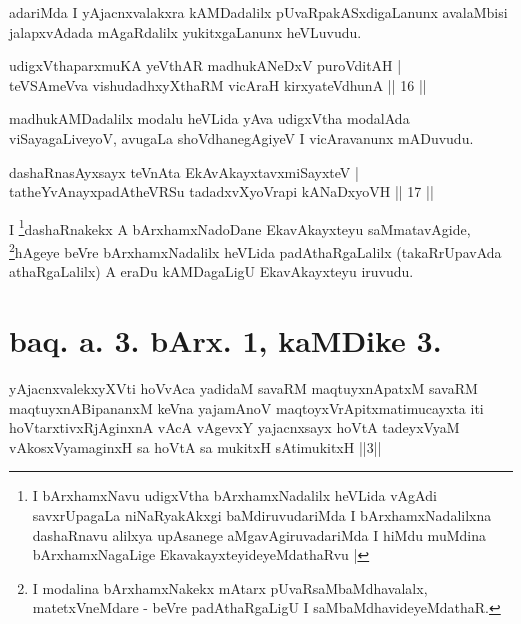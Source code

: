 \begin{artha}
adariMda I yAjacnxvalakxra kAMDadalilx pUvaRpakASxdigaLanunx avalaMbisi jalapxvAdada mAgaRdalilx yukitxgaLanunx heVLuvudu.	
\end{artha}


\begin{shl}
udigxVthaparxmuKA yeV\s thAR madhukANeDxV puroVditAH |\\
teVSAmeVva vishudadhxyXthaRM vicAraH kirxyateV\s dhunA \hfill || 16 ||
\end{shl}

\begin{artha}
madhukAMDadalilx modalu heVLida yAva udigxVtha modalAda viSayagaLiveyoV, avugaLa shoVdhanegAgiyeV I vicAravanunx mADuvudu.
\end{artha}

\begin{shl}
dashaRnasAyxsayx teVnAta EkAvAkayxtavxmiSayxteV |\\
tatheYvAnayxpadAtheVRSu tadadxvXyoVrapi kANaDxyoVH \hfill || 17 ||
\end{shl}

\begin{artha}
I \footnote[1]{I bArxhamxNavu udigxVtha bArxhamxNadalilx heVLida vAgAdi savxrUpagaLa niNaRyakAkxgi baMdiruvuda\-riMda I bArxhamxNadalilxna dashaRnavu alilxya upAsanege aMgavAgiruvadariMda I hiMdu muMdina bArxhamxNagaLige EkavakayxteyideyeMdathaRvu |}dashaRnakekx A bArxhamxNadoDane EkavAkayxteyu saMmatavAgide, \footnote[2]{I modalina bArxhamxNakekx mAtarx pUvaRsaMbaMdhavalalx, matetxVneMdare - beVre padAthaRgaLigU I saMbaMdhavideyeMdathaR.}hAgeye beVre bArxhamxNadalilx heVLida padAthaRgaLalilx (takaRrUpavAda athaRgaLalilx) A eraDu kAMDagaLigU EkavAkayxteyu iruvudu.
\end{artha}

\section*{baq. a. 3. bArx. 1, kaMDike 3.}

\begin{shl}
yAjacnxvalekxyXVti hoVvAca yadidaM savaRM maqtuyxnApatxM savaRM maqtuyxnABipananxM keVna yajamAnoV maqtoyxVrApitxmatimucayxta iti hoVtarxtivxRjAginxnA vAcA vAgevxY yajacnxsayx hoVtA tadeyxVyaM vAkosxV\s yamaginxH sa hoVtA sa mukitxH sAtimukitxH ||3||
\end{shl}

